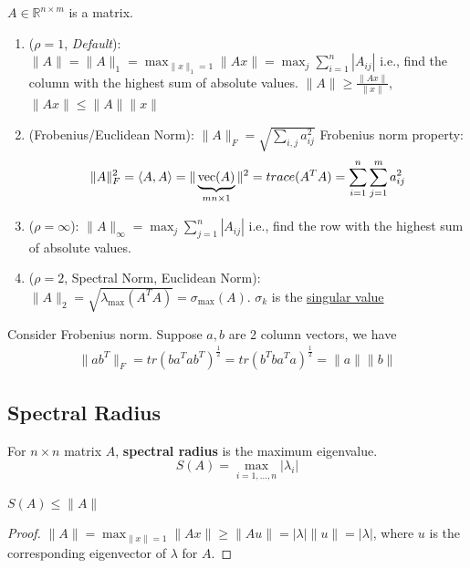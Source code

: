 \documentclass[11pt]{elegantbook}
\begin{document}
\begin{definition}
    \normalfont
    $A\in \mathbb{R}^{n\times m}$ is a matrix.
    \begin{enumerate}[$\circ$]
        \item ($\rho=1$, \textit{Default}): $\|A\|=\|A\|_1=\max _{\|x\|_1=1}\|A x\|=\max _{j} \sum_{i=1}^{n}\left|A_{i j}\right|$
        \subitem i.e., find the column with the highest sum of absolute values.
        \subitem $\|A\| \geqslant \frac{\|A x\|}{\|x\|}$, $\|Ax\| \leqslant\|A\|\|x\|$
        \item (Frobenius/Euclidean Norm): $\|A\|_{F}=\sqrt{\sum_{i, j} a_{i j}^{2}}$
        \subitem Frobenius norm property: $$\|A\|_F^2=\left\langle A,A \right\rangle=\|\underbrace{\textnormal{vec}(A)}_{mn\times 1}\|^2=trace(A^TA)=\sum_{i=1}^n\sum_{j=1}^m a_{i j}^{2}$$
        \item ($\rho=\infty$): $\|A\|_{\infty}=\max _{j} \sum_{j=1}^{n}\left|A_{i j}\right|$ \subitem i.e., find the row with the highest sum of absolute values.
        \item ($\rho=2$, Spectral Norm, Euclidean Norm): ${\displaystyle \|A\|_{2}={\sqrt {\lambda _{\max }\left(A^{T}A\right)}}=\sigma _{\max }(A).}$
        \subitem $\sigma_{k}$ is the \underline{singular value}
    \end{enumerate}
\end{definition}

\begin{proposition}
    Consider Frobenius norm. Suppose $a,b$ are 2 column vectors, we have
    \begin{equation}
        \begin{aligned}
            \|ab^T\|_F=tr(ba^Tab^T)^\frac{1}{2}=tr(b^Tba^Ta)^\frac{1}{2}=\|a\|\|b\|
        \end{aligned}
        \nonumber
    \end{equation}
\end{proposition}



\subsection{Spectral Radius}
\begin{definition}
    \normalfont
    For $n\times n$ matrix $A$, \textbf{spectral radius} is the maximum eigenvalue. $$S(A)=\max_{i=1,...,n}|\lambda_i|$$
\end{definition}

\begin{proposition}
$S(A)\leq \|A\|$
\end{proposition}
\begin{proof}
    $\|A\|=\max _{\|x\|=1}\|A x\|\geq \|Au\|=|\lambda|\|u\|=|\lambda|$, where $u$ is the corresponding eigenvector of $\lambda$ for $A$.
\end{proof}
\end{document}
